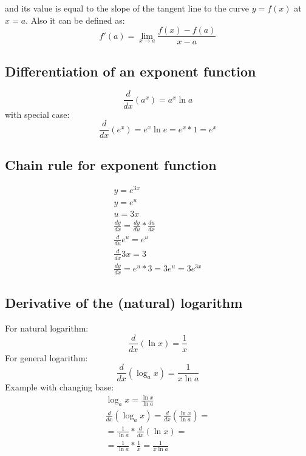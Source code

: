 \documentclass{article}
\begin{document}
and its value is equal to the slope of the tangent line to the curve $y = f(x)$ at $x=a$.
Also it can be defined as:
\begin{equation}
  f'(a) = \lim_{x \rightarrow a}\frac{f(x) - f(a)}{x-a}
\end{equation}

\subsection{Differentiation of an exponent function}
\begin{equation}
  \frac{d}{dx} (a^x) = a^x\ln a
\end{equation}
with special case:
\begin{equation}
  \frac{d}{dx} (e^x) = e^x\ln e = e^x * 1 = e^x
\end{equation}
\subsection{Chain rule for exponent function}
\begin{equation}
  \begin{gathered}
    y = e^{3x} \\
    y = e^u \\
    u = 3x \\
    \frac{dy}{dx} = \frac{dy}{du} * \frac{du}{dx} \\
    \frac{d}{du} e^u = e^u \\
    \frac{d}{dx} 3x = 3 \\
    \frac{dy}{dx} = e^u * 3 = 3e^u = 3e^{3x}
  \end{gathered}
\end{equation}

\subsection{Derivative of the (natural) logarithm}
For natural logarithm:
\begin{equation}
  \frac{d}{dx}(\ln x) = \frac{1}{x}
\end{equation}
For general logarithm:
\begin{equation}
  \frac{d}{dx}(\log_a x) = \frac{1}{x\ln a}
\end{equation}
Example with changing base:
\begin{equation}
  \begin{gathered}
  \log_ax = \frac{\ln x}{\ln a} \\
  \frac{d}{dx}(\log_ax) = \frac{d}{dx}(\frac{\ln x}{\ln a}) = \\
  = \frac{1}{\ln a} * \frac{d}{dx}(\ln x) = \\
  = \frac{1}{\ln a} * \frac{1}{x} = \frac{1}{x\ln a}
  \end{gathered}
\end{equation}
\end{document}
